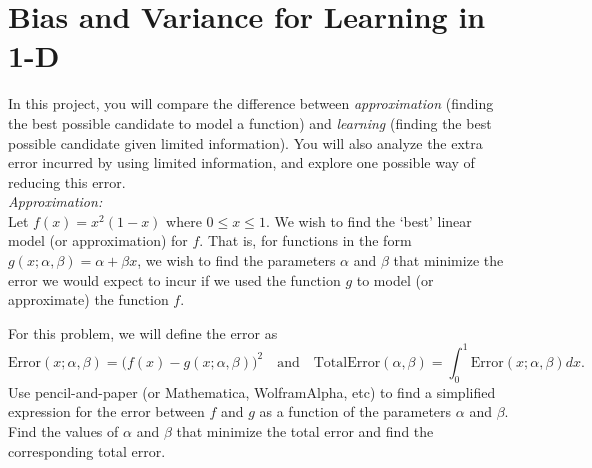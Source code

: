 \section{Bias and Variance for Learning in 1-D}
In this project, you will compare the difference between \textit{approximation} (finding the best possible candidate to model a function) and \textit{learning} (finding the best possible candidate given limited information). 
You will also analyze the extra error incurred by using limited information, and explore one possible way of reducing this error.\\

\noindent\textit{Approximation:}\\
Let $f(x) = x^2(1-x)$ where $0 \leq x \leq 1$. We wish to find the `best' linear model (or approximation) for $f$. That is, for functions in the form $g(x; \alpha, \beta) =  \alpha +  \beta x$,  we wish to find the parameters $ \alpha$ and $ \beta$ that minimize the error we would expect to incur if we used the function $g$ to model (or approximate) the function $f$. 
\begin{center}
\end{center}
For this problem, we will define the error as
\begin{equation*}
\text{Error}(x;\alpha,\beta) = \Big(f(x) - g(x; \alpha, \beta)\Big)^2 
\quad \text{and} \quad
\text{TotalError}(\alpha,\beta) = \int_0^1 \text{Error}(x; \alpha,\beta) dx.
\end{equation*} 
Use pencil-and-paper (or Mathematica, WolframAlpha, etc) to find a simplified expression for the error between $f$ and $g$ as a function of the parameters $ \alpha$ and $ \beta$. Find the values of $ \alpha$ and $ \beta$ that minimize the total error and find the corresponding total error.\\

